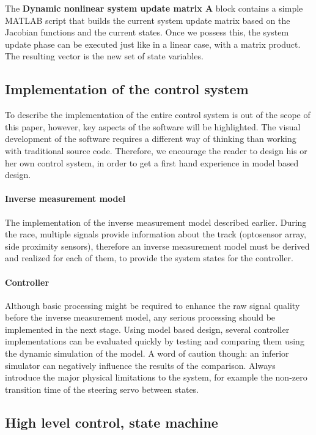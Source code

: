 The \textbf{Dynamic nonlinear system update matrix A} block contains a simple MATLAB script that builds the current system update matrix based on the Jacobian functions and the current states. Once we possess this, the system update phase can be executed just like in a linear case, with a matrix product. The resulting vector is the new set of state variables.

\subsection{Implementation of the control system}

To describe the implementation of the entire control system is out of the scope of this paper, however, key aspects of the software will be highlighted. The visual development of the software requires a different way of thinking than working with traditional source code. Therefore, we encourage the reader to design his or her own control system, in order to get a first hand experience in model based design.

\paragraph{Inverse measurement model}

The implementation of the inverse measurement model described earlier. During the race, multiple signals provide information about the track (optosensor array, side proximity sensors), therefore an inverse measurement model must be derived and realized for each of them, to provide the system states for the controller.

\paragraph{Controller}

Although basic processing might be required to enhance the raw signal quality before the inverse measurement model, any serious processing should be implemented in the next stage. Using model based design, several controller implementations can be evaluated quickly by testing and comparing them using the dynamic simulation of the model. A word of caution though: an inferior simulator can negatively influence the results of the comparison. Always introduce the major physical limitations to the system, for example the non-zero transition time of the steering servo between states.

\subsection{High level control, state machine}

